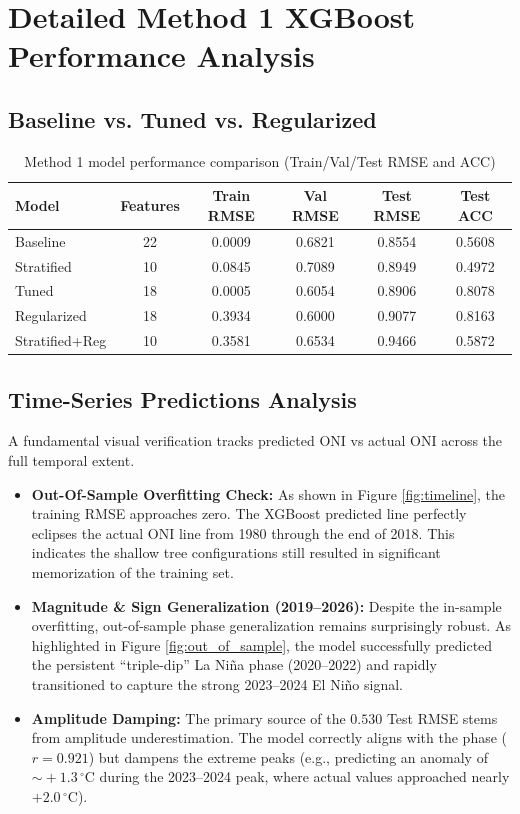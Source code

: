 \section{Detailed Method 1 XGBoost Performance Analysis}

\subsection{Baseline vs. Tuned vs. Regularized}

\begin{table}[H]
\centering
\caption{Method 1 model performance comparison (Train/Val/Test RMSE and ACC)}
\label{tab:xgb_performance}
\normalsize
\renewcommand{\arraystretch}{1.2}
\begin{tabular}{|l|c|c|c|c|c|}
\hline
\textbf{Model} & \textbf{Features} & \textbf{Train RMSE} & \textbf{Val RMSE} & \textbf{Test RMSE} & \textbf{Test ACC} \\
\hline
Baseline & 22 & 0.0009 & 0.6821 & 0.8554 & 0.5608 \\
\hline
Stratified & 10 & 0.0845 & 0.7089 & 0.8949 & 0.4972 \\
\hline
Tuned & 18 & 0.0005 & 0.6054 & 0.8906 & 0.8078 \\
\hline
Regularized & 18 & 0.3934 & 0.6000 & 0.9077 & 0.8163 \\
\hline
Stratified+Reg & 10 & 0.3581 & 0.6534 & 0.9466 & 0.5872 \\
\hline
\end{tabular}
\end{table}

\subsection{Time-Series Predictions Analysis}
A fundamental visual verification tracks predicted ONI vs actual ONI across the full temporal extent.
\begin{itemize}
\item \textbf{Out-Of-Sample Overfitting Check:} As shown in Figure \ref{fig:timeline}, the training RMSE approaches zero. The XGBoost predicted line perfectly eclipses the actual ONI line from 1980 through the end of 2018. This indicates the shallow tree configurations still resulted in significant memorization of the training set.
\item \textbf{Magnitude \& Sign Generalization (2019--2026):} Despite the in-sample overfitting, out-of-sample phase generalization remains surprisingly robust. As highlighted in Figure \ref{fig:out_of_sample}, the model successfully predicted the persistent ``triple-dip'' La Ni\~{n}a phase (2020--2022) and rapidly transitioned to capture the strong 2023--2024 El Ni\~{n}o signal.
\item \textbf{Amplitude Damping:} The primary source of the $0.530$ Test RMSE stems from amplitude underestimation. The model correctly aligns with the phase ($r = 0.921$) but dampens the extreme peaks (e.g., predicting an anomaly of $\sim\!+1.3\,^{\circ}\mathrm{C}$ during the 2023--2024 peak, where actual values approached nearly $+2.0\,^{\circ}\mathrm{C}$).
\end{itemize}

